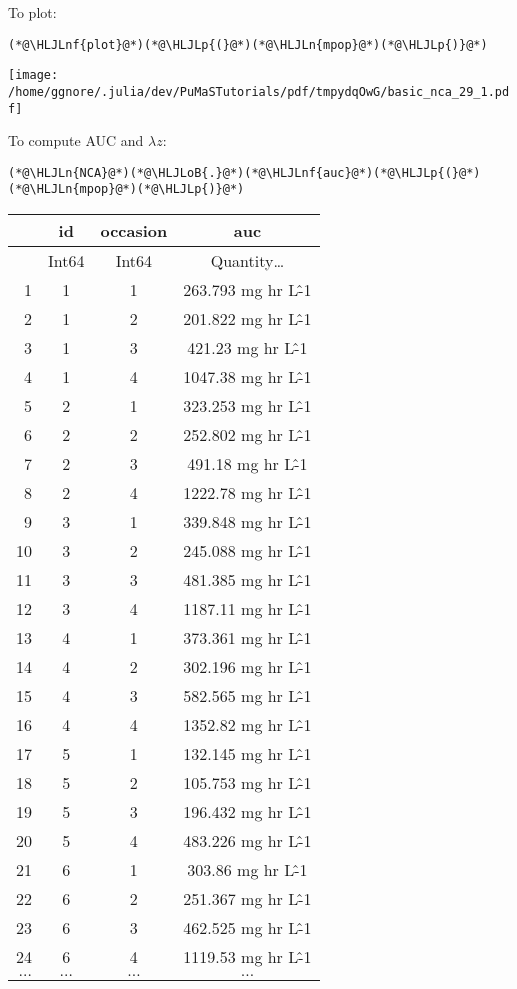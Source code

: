 \documentclass[12pt,a4paper]{article}
\newcommand{\HLJLn}[1]{#1}
\newcommand{\HLJLnf}[1]{\textcolor[RGB]{66,102,213}{#1}}
\newcommand{\HLJLoB}[1]{\textcolor[RGB]{102,102,102}{\textbf{#1}}}
\newcommand{\HLJLp}[1]{#1}
\begin{document}
To plot:


\begin{lstlisting}
(*@\HLJLnf{plot}@*)(*@\HLJLp{(}@*)(*@\HLJLn{mpop}@*)(*@\HLJLp{)}@*)
\end{lstlisting}

\texttt{[image: /home/ggnore/.julia/dev/PuMaSTutorials/pdf/tmpydqOwG/basic\_nca\_29\_1.pdf]}

To compute AUC and $\lambda z$:


\begin{lstlisting}
(*@\HLJLn{NCA}@*)(*@\HLJLoB{.}@*)(*@\HLJLnf{auc}@*)(*@\HLJLp{(}@*)(*@\HLJLn{mpop}@*)(*@\HLJLp{)}@*)
\end{lstlisting}


\begin{tabular}{r|ccc}
	& id & occasion & auc\\
	\hline
	& Int64 & Int64 & Quantity…\\
	\hline
	1 & 1 & 1 & 263.793 mg hr L\^-1 \\
	2 & 1 & 2 & 201.822 mg hr L\^-1 \\
	3 & 1 & 3 & 421.23 mg hr L\^-1 \\
	4 & 1 & 4 & 1047.38 mg hr L\^-1 \\
	5 & 2 & 1 & 323.253 mg hr L\^-1 \\
	6 & 2 & 2 & 252.802 mg hr L\^-1 \\
	7 & 2 & 3 & 491.18 mg hr L\^-1 \\
	8 & 2 & 4 & 1222.78 mg hr L\^-1 \\
	9 & 3 & 1 & 339.848 mg hr L\^-1 \\
	10 & 3 & 2 & 245.088 mg hr L\^-1 \\
	11 & 3 & 3 & 481.385 mg hr L\^-1 \\
	12 & 3 & 4 & 1187.11 mg hr L\^-1 \\
	13 & 4 & 1 & 373.361 mg hr L\^-1 \\
	14 & 4 & 2 & 302.196 mg hr L\^-1 \\
	15 & 4 & 3 & 582.565 mg hr L\^-1 \\
	16 & 4 & 4 & 1352.82 mg hr L\^-1 \\
	17 & 5 & 1 & 132.145 mg hr L\^-1 \\
	18 & 5 & 2 & 105.753 mg hr L\^-1 \\
	19 & 5 & 3 & 196.432 mg hr L\^-1 \\
	20 & 5 & 4 & 483.226 mg hr L\^-1 \\
	21 & 6 & 1 & 303.86 mg hr L\^-1 \\
	22 & 6 & 2 & 251.367 mg hr L\^-1 \\
	23 & 6 & 3 & 462.525 mg hr L\^-1 \\
	24 & 6 & 4 & 1119.53 mg hr L\^-1 \\
	$\dots$ & $\dots$ & $\dots$ & $\dots$ \\
\end{tabular}
\end{document}
